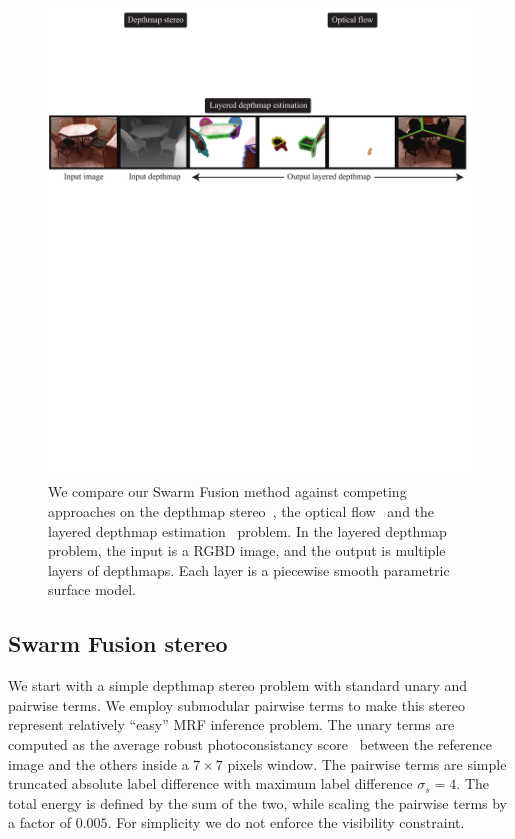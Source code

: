 %
\begin{figure}[tb]
  \includegraphics[width=\columnwidth]{figure/problem.pdf} \caption{We
    compare our Swarm Fusion method against competing approaches on the
    depthmap stereo~\cite{middlebury_stereo}, the optical
    flow~\cite{middlebury_optical_flow} and the layered depthmap
    estimation~\cite{layered_depthmap} problem. In the layered
    depthmap problem, the input is a RGBD image, and the output is
    multiple layers of depthmaps. Each layer is a piecewise smooth
    parametric surface model.}\label{fig:problem}
\end{figure}
%
%
%
\subsection{Swarm Fusion stereo}
We start with a simple depthmap stereo problem with standard unary and
pairwise terms. We employ submodular pairwise terms to make this
stereo represent relatively ``easy'' MRF inference problem.
%
The unary terms are computed as the average robust photoconsistancy
score~\cite{second_order_stereo} between the reference image and the others
inside a $7\times 7$ pixels window. The pairwise terms are simple
truncated absolute label difference with maximum label difference
$\sigma_s=4$. The total energy is defined by the sum of the two, while
scaling the pairwise terms by a factor of $0.005$. For simplicity we
do not enforce the visibility constraint.

